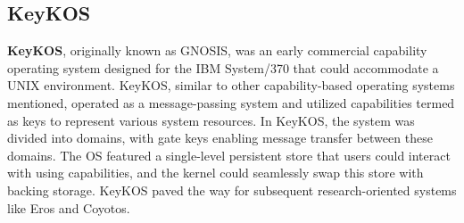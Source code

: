 \subsection{KeyKOS}
\textbf{KeyKOS}\cite{hardy_keykos_1985}, originally known as GNOSIS, was an early commercial capability operating system designed 
for the IBM System/370 that could accommodate a UNIX environment. KeyKOS, similar to other 
capability-based operating systems mentioned, operated as a message-passing system and 
utilized capabilities termed as keys to represent various system resources. In KeyKOS, 
the system was divided into domains, with gate keys enabling message transfer between 
these domains. The OS featured a single-level persistent store that users could interact 
with using capabilities, and the kernel could seamlessly swap this store with backing storage. 
KeyKOS paved the way for subsequent research-oriented systems like Eros and Coyotos.
\newline


